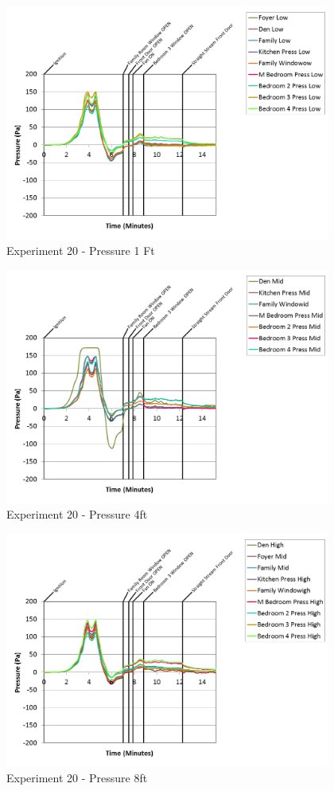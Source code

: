 \documentclass{article}
\begin{document}
\begin{appendices}
\begin{figure}[h!]
	\centering
	\includegraphics[height=3.05in]{0_Images/Results_Charts/Exp_20_Charts/Pressure1Ft.png}
	\caption{Experiment 20 - Pressure 1 Ft}
\end{figure}

\clearpage

\begin{figure}[h!]
	\centering
	\includegraphics[height=3.05in]{0_Images/Results_Charts/Exp_20_Charts/Pressure4ft.png}
	\caption{Experiment 20 - Pressure 4ft}
\end{figure}


\begin{figure}[h!]
	\centering
	\includegraphics[height=3.05in]{0_Images/Results_Charts/Exp_20_Charts/Pressure8ft.png}
	\caption{Experiment 20 - Pressure 8ft}
\end{figure}


\end{appendices}
\end{document}
